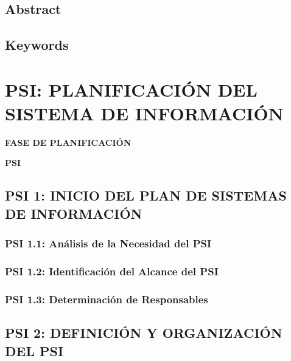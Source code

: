 \documentclass[11pt]{report}
\begin{document}
\section{Abstract}


\section{Keywords}

\pagestyle{fancy}
\chapter{PSI: PLANIFICACIÓN DEL SISTEMA DE INFORMACIÓN}

	\vspace{2cm}	
	\begin{center}
	{\Large \textbf{FASE DE PLANIFICACIÓN} \par}
	\end{center}
	\vspace{5cm}
	
	\begin{center}
	\Huge \textbf{PSI}\par
	\end{center}

\newpage

\section{PSI 1: INICIO DEL PLAN DE SISTEMAS DE INFORMACIÓN}
 

\subsection{PSI 1.1: Análisis de la Necesidad del PSI} 


\subsection{PSI 1.2: Identificación del Alcance del PSI}


\subsection{PSI 1.3: Determinación de Responsables}


\newpage
\section{PSI 2: DEFINICIÓN Y ORGANIZACIÓN DEL PSI}
 
\end{document}
